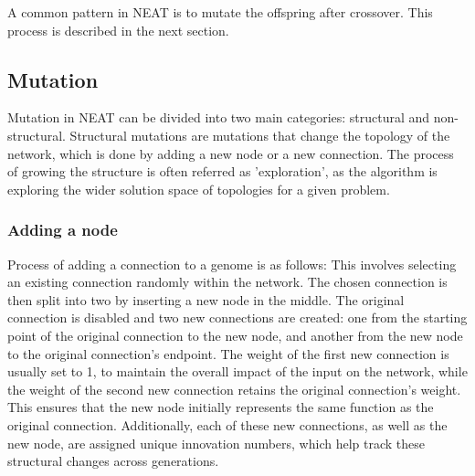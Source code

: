 \documentclass{article}
\begin{document}
A common pattern in NEAT is to mutate the offspring after crossover. This process is described in the next section.
\subsection{Mutation}
Mutation in NEAT can be divided into two main categories: structural and non-structural.
Structural mutations are mutations that change the topology of the network, which is done by adding a new node or a new connection. The process of growing
the structure is often referred as 'exploration', as the algorithm is exploring the wider solution space of topologies for a given problem.

\subsubsection{Adding a node}
Process of adding a connection to a genome is as follows:
This involves selecting an existing connection randomly within the network.
The chosen connection is then split into two by inserting a new node in the middle.
The original connection is disabled and two new connections are created: one from the starting point of the original connection to the new node,
and another from the new node to the original connection's endpoint. The weight of the first new connection is usually set to 1,
to maintain the overall impact of the input on the network, while the weight of the second new connection retains the original connection's weight.
This ensures that the new node initially represents the same function as the original connection. Additionally, each of these new connections,
as well as the new node, are assigned unique innovation numbers, which help track these structural changes across generations. 
\end{document}
